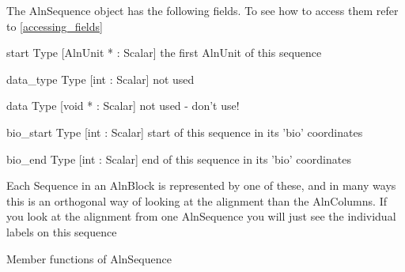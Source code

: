 The AlnSequence object has the following fields. To see how to access them refer to \ref{accessing_fields}
\begin{description}
\item{start} Type [AlnUnit * : Scalar]  the first AlnUnit of this sequence

\item{data_type} Type [int : Scalar]  not used

\item{data} Type [void * : Scalar]  not used - don't use!

\item{bio_start} Type [int : Scalar]  start of this sequence in its 'bio' coordinates

\item{bio_end} Type [int : Scalar]  end of this sequence in its 'bio' coordinates

\end{description}
Each Sequence in an AlnBlock is represented by one of these, and
in many ways this is an orthogonal way of looking at the alignment
than the AlnColumns. If you look at the alignment from one 
AlnSequence you will just see the individual labels on this 
sequence




Member functions of AlnSequence

